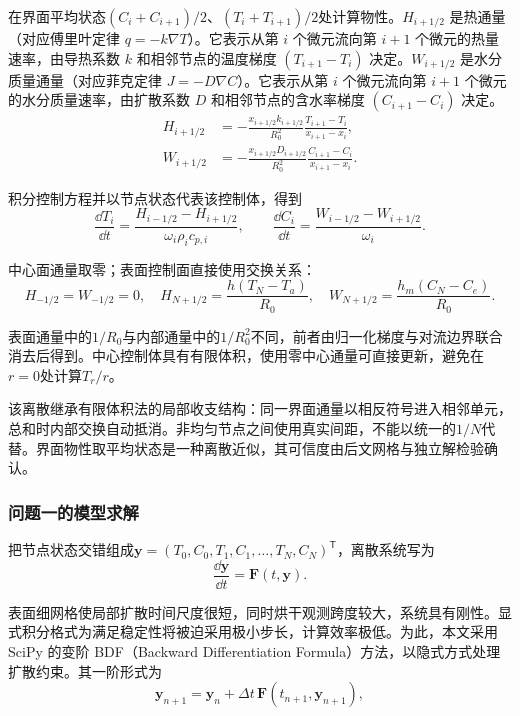 在界面平均状态$(C_i+C_{i+1})/2$、$(T_i+T_{i+1})/2$处计算物性。\(H_{i+1/2}\) 是热通量（对应傅里叶定律 \(q = -k \nabla T\)）。它表示从第 \(i\) 个微元流向第 \(i+1\) 个微元的热量速率，由导热系数 \(k\) 和相邻节点的温度梯度 \((T_{i+1} - T_i)\) 决定。\(W_{i+1/2}\) 是水分质量通量（对应菲克定律 \(J = -D \nabla C\)）。它表示从第 \(i\) 个微元流向第 \(i+1\) 个微元的水分质量速率，由扩散系数 \(D\) 和相邻节点的含水率梯度 \((C_{i+1} - C_i)\) 决定。
\begin{equation}
\begin{aligned}
H_{i+1/2}&=-\frac{x_{i+1/2}k_{i+1/2}}{R_0^2}
\frac{T_{i+1}-T_i}{x_{i+1}-x_i},\\
W_{i+1/2}&=-\frac{x_{i+1/2}D_{i+1/2}}{R_0^2}
\frac{C_{i+1}-C_i}{x_{i+1}-x_i}.
\end{aligned}
\label{eq:fluxes}
\end{equation}

积分控制方程并以节点状态代表该控制体，得到
\begin{equation}
\frac{\dd T_i}{\dd t}
=\frac{H_{i-1/2}-H_{i+1/2}}{\omega_i\rho_i c_{p,i}},
\qquad
\frac{\dd C_i}{\dd t}
=\frac{W_{i-1/2}-W_{i+1/2}}{\omega_i}.
\label{eq:ode}
\end{equation}

中心面通量取零；表面控制面直接使用交换关系：
\begin{equation}
H_{-1/2}=W_{-1/2}=0,\quad
H_{N+1/2}=\frac{h(T_N-T_a)}{R_0},\quad
W_{N+1/2}=\frac{h_m(C_N-C_e)}{R_0}.
\label{eq:facebc}
\end{equation}

表面通量中的$1/R_0$与内部通量中的$1/R_0^2$不同，前者由归一化梯度与对流边界联合消去后得到。中心控制体具有有限体积，使用零中心通量可直接更新，避免在$r=0$处计算$T_r/r$。

该离散继承有限体积法的局部收支结构\cite{patankar}：同一界面通量以相反符号进入相邻单元，总和时内部交换自动抵消。非均匀节点之间使用真实间距，不能以统一的$1/N$代替。界面物性取平均状态是一种离散近似，其可信度由后文网格与独立解检验确认。

\nextpage
\subsubsection{问题一的模型求解}
把节点状态交错组成$\bm y=(T_0,C_0,T_1,C_1,\ldots,T_N,C_N)^\mathsf T$，离散系统写为
\begin{equation}
\frac{\dd\bm y}{\dd t}=\bm F(t,\bm y).
\end{equation}

表面细网格使局部扩散时间尺度很短，同时烘干观测跨度较大，系统具有刚性。显式积分格式为满足稳定性将被迫采用极小步长，计算效率极低。为此，本文采用 SciPy 的变阶 BDF（Backward Differentiation Formula）方法\cite{scipy,shampine,bdfdocs}，以隐式方式处理扩散约束。其一阶形式为
\begin{equation}
\bm y_{n+1}=\bm y_n+\Delta t\,\bm F(t_{n+1},\bm y_{n+1}),
\end{equation}

